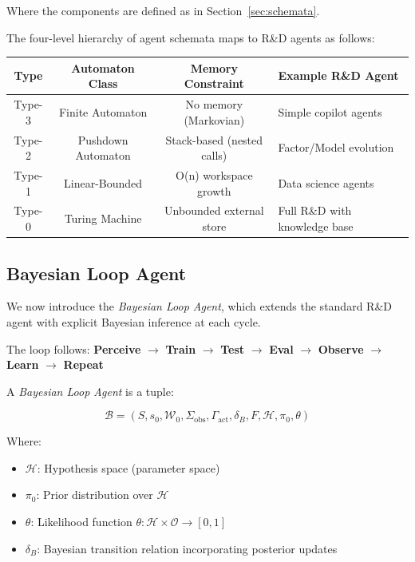 Where the components are defined as in Section~\ref{sec:schemata}.

\medskip

The four-level hierarchy of agent schemata maps to R\&D agents as follows:

\begin{center}
\begin{tabular}{|c|c|c|p{3cm}|}
\hline
Type & Automaton Class & Memory Constraint & Example R\&D Agent \\
\hline
Type-3 & Finite Automaton & No memory (Markovian) & Simple copilot agents \\
Type-2 & Pushdown Automaton & Stack-based (nested calls) & Factor/Model evolution \\
Type-1 & Linear-Bounded & O(n) workspace growth & Data science agents \\
Type-0 & Turing Machine & Unbounded external store & Full R\&D with knowledge base \\
\hline
\end{tabular}
\end{center}

\subsection{Bayesian Loop Agent}

We now introduce the \emph{Bayesian Loop Agent}, which extends the standard R\&D agent with explicit Bayesian inference at each cycle.

\medskip

The loop follows: \textbf{Perceive} $\to$ \textbf{Train} $\to$ \textbf{Test} $\to$ \textbf{Eval} $\to$ \textbf{Observe} $\to$ \textbf{Learn} $\to$ \textbf{Repeat}

\begin{definition}
\label{def:bayesian_schema}
A \emph{Bayesian Loop Agent} is a tuple:

\[
\mathcal{B} = (S, s_0, \mathcal{W}_0, \Sigma_{\mathrm{obs}}, \Gamma_{\mathrm{act}}, \delta_B, F, \mathcal{H}, \pi_0, \theta)
\]

Where:
\begin{itemize}
\item $\mathcal{H}$: Hypothesis space (parameter space)
\item $\pi_0$: Prior distribution over $\mathcal{H}$
\item $\theta$: Likelihood function $\theta: \mathcal{H} \times \mathcal{O} \to [0,1]$
\item $\delta_B$: Bayesian transition relation incorporating posterior updates
\end{itemize}
\end{definition}

